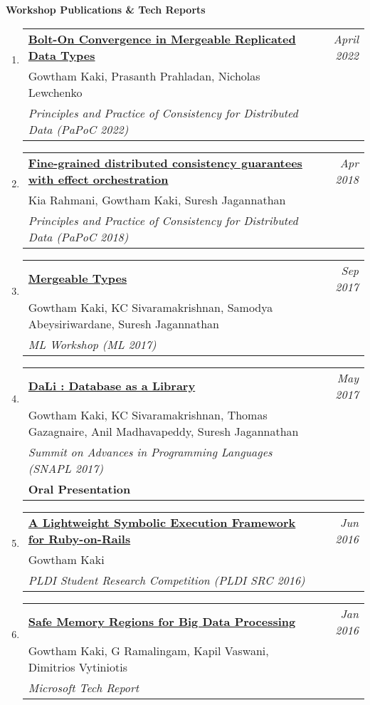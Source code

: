 \documentclass[10pt]{article}
\makeatletter
\newcommand{\lbar}[1]{{\color{#1}\ding{118}}\hspace*{2pt}}
\newenvironment{benumerate}[2]{
    \let\oldItem\item
    \def\item{\addtocounter{enumi}{-2}\oldItem}
    \begin{enumerate}[#2] \itemsep3pt
    \setcounter{enumi}{#1}
    \addtocounter{enumi}{1}}
  {\end{enumerate}}
\newenvironment{publication}[5]
{ \item
  \begin{tabular*}{7.5in}{p{6.3in}@{\extracolsep{\fill}}r}
    \href{#1}{\textbf{#2}} & \textit{#3}\\ #4 &\\ \textit{#5}&\\
  \end{tabular*}
} {}
\newenvironment{publicationNote}[6]
{ \item
  \begin{tabular*}{7.5in}{p{6.3in}@{\extracolsep{\fill}}r}
    \href{#1}{\textbf{#2}} & \textit{#3}\\ #4 &\\ \textit{#5}\\ \textbf{#6} \\
  \end{tabular*}
} {}
\newenvironment{region}[3]{%
  \vspace*{0.5ex}
  {{\textbf{\large{#1}}}}
  \begin{benumerate}{#3}{\color{RoyalBlue}#2}}
  {\end{benumerate}\vspace{0.8ex}}
\makeatother
\begin{document}
\begin{region} {\lbar{Mahogany}Workshop Publications \& Tech Reports}{{W}1}{5}

	\begin{publication} {https://gowthamk.github.io/docs/papoc22.pdf}
		{Bolt-On Convergence in Mergeable Replicated Data Types}
		{April 2022} {Gowtham Kaki, Prasanth Prahladan, Nicholas Lewchenko}
		{Principles and Practice of Consistency for Distributed Data
    (PaPoC 2022)}
  \end{publication}

	\begin{publication}{https://gowthamk.github.io/docs/papoc18.pdf}
		{Fine-grained distributed consistency guarantees with effect orchestration}
		{Apr 2018}{Kia Rahmani, Gowtham Kaki, Suresh Jagannathan}
    {Principles and Practice of Consistency for Distributed Data (PaPoC 2018)}
  \end{publication}

  \begin{publication}{http://kcsrk.info/papers/mergeable_types_ml17.pdf}
    {Mergeable Types}
    {Sep 2017}{Gowtham Kaki, KC Sivaramakrishnan, Samodya Abeysiriwardane, Suresh Jagannathan}
    {ML Workshop (ML 2017)}
  \end{publication}

	\begin{publicationNote} {http://kcsrk.info/papers/dali_snapl17.pdf}
    {DaLi : Database as a Library}
    {May 2017} {Gowtham Kaki, KC Sivaramakrishnan, Thomas Gazagnaire, Anil Madhavapeddy, Suresh Jagannathan}
    {Summit on Advances in Programming Languages (SNAPL 2017)}
    {Oral Presentation}
  \end{publicationNote}

  \begin{publication}{http://purduepl.github.io/docs/maglev.pdf}
    {A Lightweight Symbolic Execution Framework for Ruby-on-Rails}
    {Jun 2016}{Gowtham Kaki} {PLDI Student Research Competition (PLDI SRC 2016)}
  \end{publication}

  \begin{publication}{https://www.microsoft.com/en-us/research/publication/safe-memory-regions-big-data-processing}
    {Safe Memory Regions for Big Data Processing}
    {Jan 2016}{Gowtham Kaki, G Ramalingam, Kapil Vaswani, Dimitrios
    Vytiniotis} {Microsoft Tech Report}
  \end{publication}

\end{region}
\end{document}
